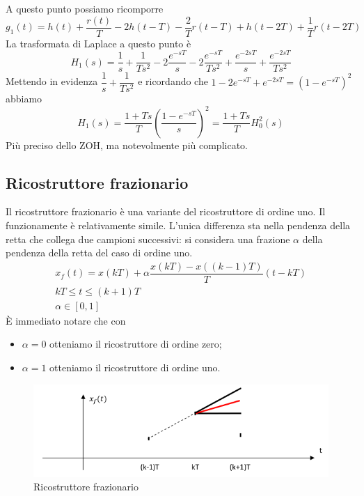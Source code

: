 \documentclass[a4paper]{report}
\begin{document}
A questo punto possiamo ricomporre
\[
g_1(t) = h(t) + \dfrac{r(t)}{T} - 2h(t - T) - \dfrac{2}{T}r(t - T) +
h(t - 2T) + \dfrac{1}{T}r(t - 2T) 
\]
La trasformata di Laplace a questo punto \`e
\[
H_1(s) = \dfrac{1}{s} + \dfrac{1}{T s^2} - 2\dfrac{e^{-sT}}{s} -
2\dfrac{e^{-sT}}{T s^2} + \dfrac{e^{-2sT}}{s} + \dfrac{e^{-2sT}}{T
  s^2}
\]
Mettendo in evidenza $\dfrac{1}{s} + \dfrac{1}{T s^2}$ e ricordando
che $1 - 2 e^{-sT} + e^{-2sT} = (1 - e^{-sT})^2$ abbiamo
\begin{equation}\label{eq:ricostruttoreOrdineUno}
  H_1(s) = \dfrac{1 + Ts}{T} \left( \dfrac{1 - e^{-sT}}{s}\right)^2 =
  \dfrac{1 + Ts}{T} H_0^2(s)
\end{equation}
Pi\`u preciso dello ZOH, ma notevolmente pi\`u complicato.

\subsection{Ricostruttore frazionario}
Il ricostruttore frazionario \`e una variante del ricostruttore di
ordine uno. Il funzionamente \`e relativamente simile. L'unica
differenza sta nella pendenza della retta che collega due campioni
successivi: si considera una frazione $\alpha$ della pendenza della
retta del caso di ordine uno.
\begin{equation}
  \begin{array}{l}
    x_f(t) = x(kT) + \alpha \dfrac{x(kT) - x((k - 1)T)}{T}(t - kT)\\
    kT \leq t \leq (k + 1)T\\
    \alpha \in [0, 1]
  \end{array}
\end{equation}
\`E immediato notare che con
\begin{itemize}
\item $\alpha = 0$ otteniamo il ricostruttore di ordine zero;
\item $\alpha = 1$ otteniamo il ricostruttore di ordine uno.
\end{itemize}
\begin{figure}[!h]
  \begin{center}
    \includegraphics[scale=0.4]{./figures/ricostruttoreFrazionario00.png}
    \caption{Ricostruttore frazionario}\label{fig:ricostruttoreFrazionario00}
  \end{center}
\end{figure}
\end{document}
